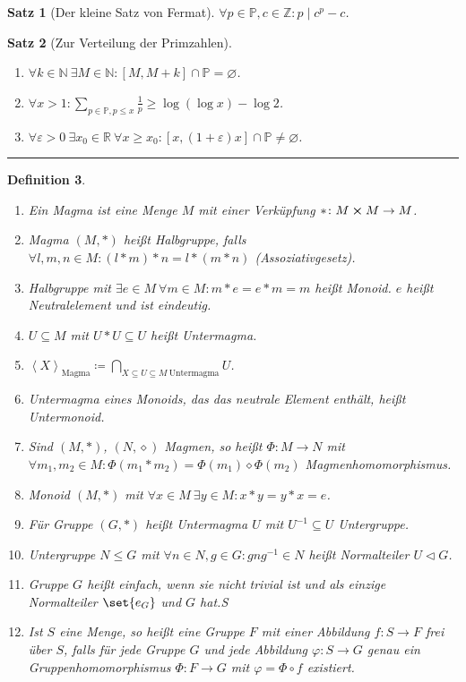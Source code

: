 \documentclass[a4paper]{article}
\newcounter{Sec}
\theoremstyle{marginbreak}
\newtheorem{definition}{Definition}[Sec]
\newtheorem{satz}[definition]{Satz}
\newcommand{\sep}{%
	\rule{\textwidth}{0.3pt}%
	\stepcounter{Sec}%
	}
\newcommand\divides\mid
\newcommand{\Z}{\mathbb{Z}}
\newcommand{\N}{\mathbb{N}}
\renewcommand{\P}{\mathbb{P}}
\newcommand{\R}{\mathbb{R}}
\newcommand\gen[2][]{\left\langle#2\right\rangle_{\text{#1}}}
\newcommand\nt\triangleleft
\begin{document}
\begin{satz}[Der kleine Satz von Fermat]
	$\forall p\in\P, c\in\Z: p\divides c^p-c$.
\end{satz}
\begin{satz}[Zur Verteilung der Primzahlen]
	\begin{enumerate}[label=(\alph*)]
		\item $\forall k\in\N~\exists M\in\N: [M, M+k]\cap\P=\varnothing$.
		\item $\forall x>1:\sum_{p\in\P, p\leq x}\frac{1}{p}\geq\log(\log x)-\log 2$.
		\item $\forall\varepsilon>0~\exists x_0\in\R~\forall x\geq x_0: [x, (1+\varepsilon)x]\cap\P\neq\varnothing$.
	\end{enumerate}
\end{satz}
\sep
\begin{definition}
	\begin{enumerate}[label=(\alph*)]
		\item Ein Magma ist eine Menge $M$ mit einer Verküpfung $*\colon M\cross M\to M$.
		\item Magma $(M, *)$ heißt Halbgruppe, falls $\forall l, m, n\in M: (l*m)*n=l*(m*n)$ (Assoziativgesetz).
		\item Halbgruppe mit $\exists e\in M~\forall m\in M: m*e=e*m=m$ heißt Monoid. $e$ heißt Neutralelement und ist eindeutig.
		\item $U\subseteq M$ mit $U*U\subseteq U$ heißt Untermagma.
		\item $\gen[Magma]{X}\coloneqq \bigcap_{X\subseteq U\subseteq M~\text{Untermagma}}U$.
		\item Untermagma eines Monoids, das das neutrale Element enthält, heißt Untermonoid.
		\item Sind $(M, *)$, $(N,\diamond)$ Magmen, so heißt $\Phi\colon M\to N$ mit
			$\forall m_1, m_2\in M:\Phi(m_1*m_2)=\Phi(m_1)\diamond\Phi(m_2)$ Magmenhomomorphismus.
		\item Monoid $(M, *)$ mit $\forall x\in M~\exists y\in M: x*y=y*x=e$.
		\item Für Gruppe $(G, *)$ heißt Untermagma $U$ mit $U^{-1}\subseteq U$ Untergruppe.
		\item Untergruppe $N\leq G$ mit $\forall n\in N, g\in G: gng^{-1}\in N$ heißt Normalteiler $U\nt G$.
		\item Gruppe $G$ heißt einfach, wenn sie nicht trivial ist und als einzige Normalteiler $\set{e_G}$ und
			$G$ hat.S
		\item Ist $S$ eine Menge, so heißt eine Gruppe $F$ mit einer Abbildung $f\colon S\to F$ frei über $S$, falls
			für jede Gruppe $G$ und jede Abbildung $\varphi\colon S\to G$ genau ein Gruppenhomomorphismus $\Phi\colon F\to G$
			mit $\varphi=\Phi\circ f$ existiert.
	\end{enumerate}
\end{definition}
\end{document}
